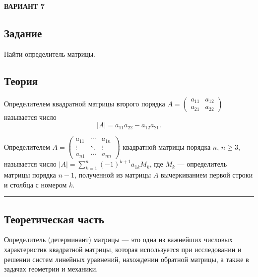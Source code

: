 \documentclass[12pt,a4paper]{article}
\begin{document}
\pagestyle{plain} %
\setcounter{page}{2} %

\begin{center}
    \large\textbf{ВАРИАНТ 7}
\end{center}

\vspace{0.3cm}

\subsection*{Задание}
Найти определитель матрицы.

\vspace{0.3cm}

\subsection*{Теория}

Определителем квадратной матрицы второго порядка $A = \begin{pmatrix} a_{11} & a_{12} \\ a_{21} & a_{22} \end{pmatrix}$ называется число
\[
|A| = a_{11}a_{22} - a_{12}a_{21}.
\]

Определителем $A = \begin{pmatrix} a_{11} & \cdots & a_{1n} \\ \vdots & \ddots & \vdots \\ a_{n1} & \cdots & a_{nn} \end{pmatrix}$ квадратной матрицы порядка $n$, $n \ge 3$, называется число $|A| = \sum_{k=1}^{n} (-1)^{k+1} a_{1k} M_k$, где $M_k$ --- определитель матрицы порядка $n - 1$, полученной из матрицы $A$ вычеркиванием первой строки и столбца с номером $k$.

\vspace{0.5cm}
\hrule
\vspace{0.5cm}

\subsection*{Теоретическая часть}

Определитель (детерминант) матрицы --- это одна из важнейших числовых характеристик квадратной матрицы, которая используется при исследовании и решении систем линейных уравнений, нахождении обратной матрицы, а также в задачах геометрии и механики.
\end{document}
